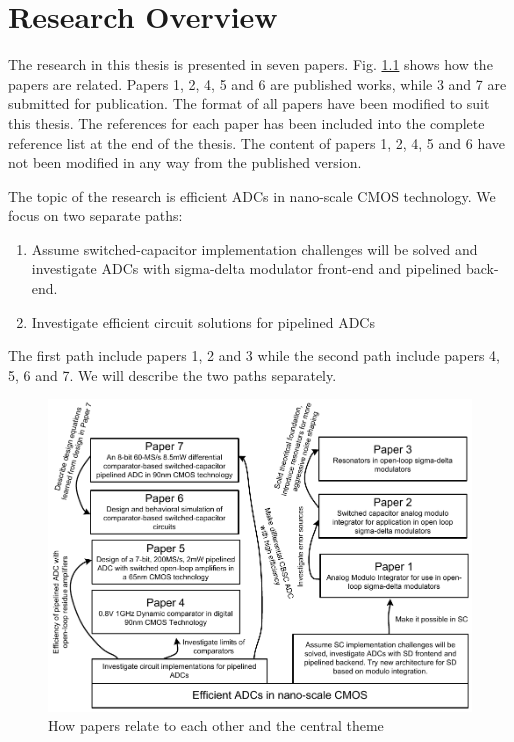 
\chapter{Research Overview}\label{sc:research}

The research in this thesis is presented in seven papers. 
Fig. \ref{fig:papers} shows how the papers are related. Papers 1, 2,
4, 5 and 6 are published works, while
3 and 7 are submitted for publication. The format of all papers have been
modified to suit this thesis. The references for each paper has been
included into the complete reference list at the end of the
thesis. The content of papers 1, 2, 4, 5 and 6 have
not been modified in any way from the published version.

The topic of the research is efficient ADCs in
nano-scale CMOS technology. We focus on two separate paths:
\begin{enumerate}
\item Assume switched-capacitor implementation challenges will be
  solved and investigate ADCs with sigma-delta modulator front-end and pipelined back-end.
\item Investigate efficient circuit solutions for pipelined ADCs

\end{enumerate}
The first path include papers 1, 2 and 3 while the second path
include papers 4, 5, 6 and 7. We will describe the two paths separately.

\begin{figure}[htbp]
\centerline{ \includegraphics[width=\myfigwidthm]{graphics/paperrel}}
  \caption{How papers relate to each other and the central theme}
  \label{fig:papers}
\end{figure}

